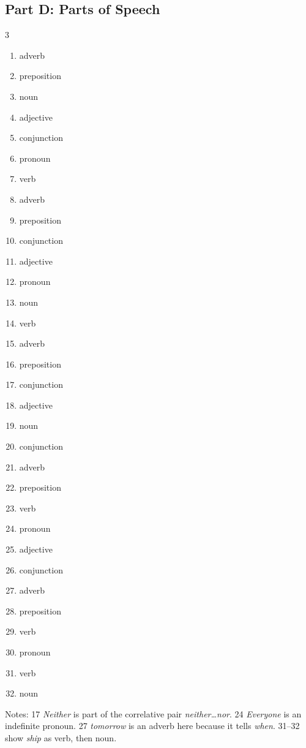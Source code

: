 \documentclass[11pt]{article}
\begin{document}
\subsection*{Part D: Parts of Speech}
\begin{multicols}{3}
\begin{enumerate}
  \item adverb
  \item preposition
  \item noun
  \item adjective
  \item conjunction
  \item pronoun
  \item verb
  \item adverb
  \item preposition
  \item conjunction
  \item adjective
  \item pronoun
  \item noun
  \item verb
  \item adverb
  \item preposition
  \item conjunction
  \item adjective
  \item noun
  \item conjunction
  \item adverb
  \item preposition
  \item verb
  \item pronoun
  \item adjective
  \item conjunction
  \item adverb
  \item preposition
  \item verb
  \item pronoun
  \item verb
  \item noun
\end{enumerate}
\end{multicols}
\noindent\small Notes: 17 \textit{Neither} is part of the correlative pair \textit{neither\dots nor}. 24 \textit{Everyone} is an indefinite pronoun. 27 \textit{tomorrow} is an adverb here because it tells \textit{when}. 31--32 show \textit{ship} as verb, then noun.\normalsize
\end{document}
